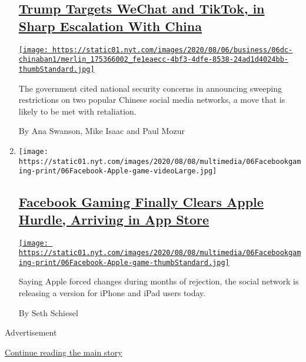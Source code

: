 \begin{enumerate}
  \hypertarget{trump-targets-wechat-and-tiktok-in-sharp-escalation-with-china}{%
  \subsection{\texorpdfstring{\href{/2020/08/06/technology/trump-wechat-tiktok-china.html}{Trump
  Targets WeChat and TikTok, in Sharp Escalation With
  China}}{Trump Targets WeChat and TikTok, in Sharp Escalation With China}}\label{trump-targets-wechat-and-tiktok-in-sharp-escalation-with-china}}

  \href{/2020/08/06/technology/trump-wechat-tiktok-china.html}{\texttt{[image: https://static01.nyt.com/images/2020/08/06/business/06dc-chinaban1/merlin\_175366002\_fe1eaecc-4bf3-4dfe-8538-24ad1d4024bb-thumbStandard.jpg]}}

  The government cited national security concerns in announcing sweeping
  restrictions on two popular Chinese social media networks, a move that
  is likely to be met with retaliation.

  By Ana Swanson, Mike Isaac and Paul Mozur
\item
  \texttt{[image: https://static01.nyt.com/images/2020/08/08/multimedia/06Facebookgaming-print/06Facebook-Apple-game-videoLarge.jpg]}

  \hypertarget{facebook-gaming-finally-clears-apple-hurdle-arriving-in-app-store}{%
  \subsection{\texorpdfstring{\href{/2020/08/07/technology/facebook-apple-gaming-app-store.html}{Facebook
  Gaming Finally Clears Apple Hurdle, Arriving in App
  Store}}{Facebook Gaming Finally Clears Apple Hurdle, Arriving in App Store}}\label{facebook-gaming-finally-clears-apple-hurdle-arriving-in-app-store}}

  \href{/2020/08/07/technology/facebook-apple-gaming-app-store.html}{\texttt{[image: https://static01.nyt.com/images/2020/08/08/multimedia/06Facebookgaming-print/06Facebook-Apple-game-thumbStandard.jpg]}}

  Saying Apple forced changes during months of rejection, the social
  network is releasing a version for iPhone and iPad users today.

  By Seth Schiesel
\end{enumerate}

Advertisement

\protect\hyperlink{after-mid1}{Continue reading the main story}

